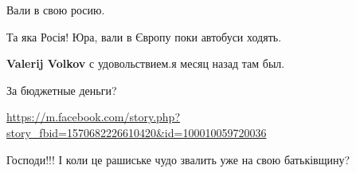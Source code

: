 \begin{itemize}
 
Вали в свою росию.

\begin{itemize}
 
Та яка Росія!
Юра, вали в Європу поки автобуси ходять.

 
\textbf{Valerij Volkov} с удовольствием.я месяц назад там был.

 
За бюджетные деньги?
\end{itemize}

 
\url{https://m.facebook.com/story.php?story_fbid=1570682226610420&id=100010059720036}

 
Господи!!! І коли це рашиське чудо звалить уже на свою батьківщину?

 

\end{itemize}
